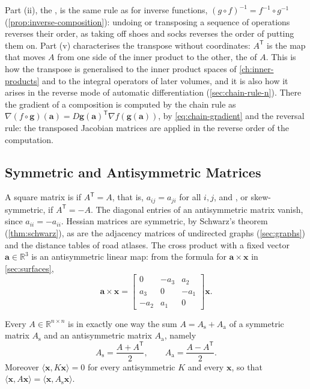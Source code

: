 Part (ii), the , is the same rule as for inverse functions, $(g\circ f)^{-1}=f^{-1}\circ g^{-1}$ (\cref{prop:inverse-composition}): undoing or transposing a sequence of operations reverses their order, as taking off shoes and socks reverses the order of putting them on. Part (v) characterises the transpose without coordinates: $A^{\mathsf T}$ is the map that moves $A$ from one side of the inner product to the other, the  of $A$. This is how the transpose is generalised to the inner product spaces of \cref{ch:inner-products} and to the integral operators of later volumes, and it is also how it arises in the reverse mode of automatic differentiation (\cref{sec:chain-rule-n}). There the gradient of a composition is computed by the chain rule as $\nabla(f\circ\mathbf g)(\mathbf a)=D\mathbf g(\mathbf a)^{\mathsf T}\nabla f(\mathbf g(\mathbf a))$, by \eqref{eq:chain-gradient} and the reversal rule: the transposed Jacobian matrices are applied in the reverse order of the computation.

\subsection{Symmetric and Antisymmetric Matrices}

A square matrix is  if $A^{\mathsf T}=A$, that is, $a_{ij}=a_{ji}$ for all $i,j$, and , or skew-symmetric, if $A^{\mathsf T}=-A$. The diagonal entries of an antisymmetric matrix vanish, since $a_{ii}=-a_{ii}$. Hessian matrices are symmetric, by Schwarz's theorem (\cref{thm:schwarz}), as are the adjacency matrices of undirected graphs (\cref{sec:graphs}) and the distance tables of road atlases. The cross product with a fixed vector $\mathbf a\in\mathbb R^3$ is an antisymmetric linear map: from the formula for $\mathbf a\times\mathbf x$ in \cref{sec:surfaces},
\[
\mathbf a\times\mathbf x=\begin{bmatrix}0&-a_3&a_2\\a_3&0&-a_1\\-a_2&a_1&0\end{bmatrix}\mathbf x .
\]

\begin{proposition}
\label{prop:symmetric-parts}
Every $A\in\mathbb R^{n\times n}$ is in exactly one way the sum $A=A_{\mathrm s}+A_{\mathrm a}$ of a symmetric matrix $A_{\mathrm s}$ and an antisymmetric matrix $A_{\mathrm a}$, namely
\[
A_{\mathrm s}=\frac{A+A^{\mathsf T}}2,\qquad A_{\mathrm a}=\frac{A-A^{\mathsf T}}2 .
\]
Moreover $\langle\mathbf x,K\mathbf x\rangle=0$ for every antisymmetric $K$ and every $\mathbf x$, so that $\langle\mathbf x,A\mathbf x\rangle=\langle\mathbf x,A_{\mathrm s}\mathbf x\rangle$.
\end{proposition}


